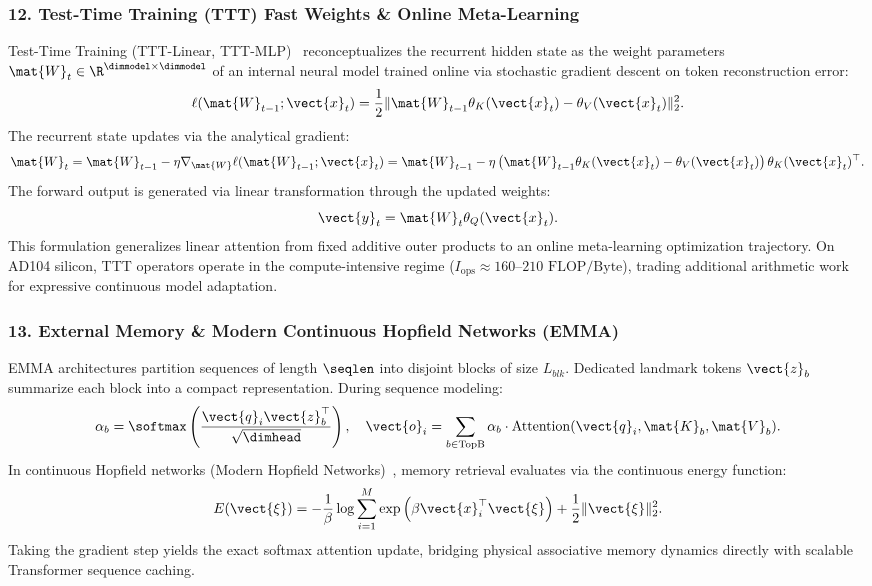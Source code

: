 \subsubsection{12. Test-Time Training (TTT) Fast Weights \& Online Meta-Learning}
\label{subsubsec:ttt_contract}
Test-Time Training (TTT-Linear, TTT-MLP)~\cite{sun2024ttt} reconceptualizes the recurrent hidden state as the weight parameters $\mat{W}_t \in \R^{\dimmodel \times \dimmodel}$ of an internal neural model trained online via stochastic gradient descent on token reconstruction error:
\begin{equation}
\ell(\mat{W}_{t-1}; \vect{x}_t) = \frac{1}{2} \|\mat{W}_{t-1} \theta_K(\vect{x}_t) - \theta_V(\vect{x}_t)\|_2^2.
\end{equation}
The recurrent state updates via the analytical gradient:
\begin{equation}
\mat{W}_t = \mat{W}_{t-1} - \eta \nabla_{\mat{W}} \ell(\mat{W}_{t-1}; \vect{x}_t) = \mat{W}_{t-1} - \eta \left( \mat{W}_{t-1} \theta_K(\vect{x}_t) - \theta_V(\vect{x}_t) \right) \theta_K(\vect{x}_t)^\top.
\end{equation}
The forward output is generated via linear transformation through the updated weights:
\begin{equation}
\vect{y}_t = \mat{W}_t \theta_Q(\vect{x}_t).
\end{equation}
This formulation generalizes linear attention from fixed additive outer products to an online meta-learning optimization trajectory. On AD104 silicon, TTT operators operate in the compute-intensive regime ($I_{\text{ops}} \approx 160\text{--}210\text{ FLOP/Byte}$), trading additional arithmetic work for expressive continuous model adaptation.

\subsubsection{13. External Memory \& Modern Continuous Hopfield Networks (EMMA)}
\label{subsubsec:emma_contract}
EMMA architectures partition sequences of length $\seqlen$ into disjoint blocks of size $L_{blk}$. Dedicated landmark tokens $\vect{z}_b$ summarize each block into a compact representation. During sequence modeling:
\begin{equation}
\alpha_b = \softmax\left( \frac{\vect{q}_i \vect{z}_b^\top}{\sqrt{\dimhead}} \right), \quad \vect{o}_i = \sum_{b \in \operatorname{TopB}} \alpha_b \cdot \operatorname{Attention}(\vect{q}_i, \mat{K}_b, \mat{V}_b).
\end{equation}
In continuous Hopfield networks (Modern Hopfield Networks)~\cite{ramsauer2020hopfield}, memory retrieval evaluates via the continuous energy function:
\begin{equation}
E(\vect{\xi}) = -\frac{1}{\beta} \log \sum_{i=1}^M \exp\left( \beta \vect{x}_i^\top \vect{\xi} \right) + \frac{1}{2} \|\vect{\xi}\|_2^2.
\end{equation}
Taking the gradient step yields the exact softmax attention update, bridging physical associative memory dynamics directly with scalable Transformer sequence caching.

